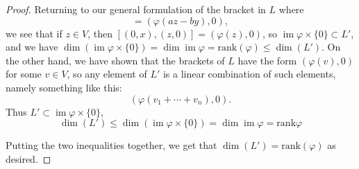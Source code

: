 \documentclass[12pt]{article}
\DeclareMathOperator{\im}{im}
\theoremstyle{definition}
\begin{document}
\begin{proof}
	Returning to our general formulation of the bracket in $L$ where \begin{equation*}
		[(y, ax), (z, bx)] = (\varphi(az - by), 0),
	\end{equation*}
	we see that if $z \in V$, then $[(0, x), (z, 0)] = (\varphi(z), 0)$, so $\im\varphi \times \lbrace 0 \rbrace \subset L'$, and we have $\dim(\im\varphi \times \lbrace 0 \rbrace) = \dim\im\varphi = \mathrm{rank}(\varphi) \leq \dim(L')$.
	On the other hand, we have shown that the brackets of $L$ have the form $(\varphi(v), 0)$ for some $v \in V$, so any element of $L'$ is a linear combination of such elements, namely something like this: \begin{equation*}
		(\varphi(v_1 + \cdots + v_n), 0).
	\end{equation*}
	Thus $L' \subset \im\varphi \times \lbrace 0 \rbrace$, \begin{equation*}
		\dim(L') \leq \dim(\im\varphi \times \lbrace 0 \rbrace) = \dim \im\varphi = \mathrm{rank}\varphi
	\end{equation*}

	Putting the two inequalities together, we get that $\dim(L') = \mathrm{rank}(\varphi)$ as desired.
\end{proof}
\end{document}
